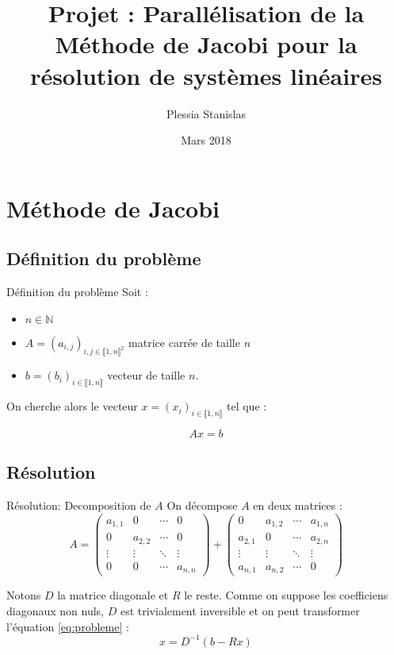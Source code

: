 \documentclass{beamer}
\title[Parallélisation de l'algorithme de Jacobi]{Projet : Parallélisation de la Méthode de Jacobi pour la résolution de systèmes linéaires}
\author{Plessia Stanislas}
\institute{}
\date{Mars 2018}
\begin{document}
\begin{frame}
  \titlepage
\end{frame}

\section{Méthode de Jacobi}

\subsection{Définition du problème}

\begin{frame}{Définition du problème}
  Soit :
  \begin{itemize}
   \item $n \in \mathbb{N}$ 
   \item $A = (a_{i,j})_{i,j \in \llbracket 1,n \rrbracket^2}$ matrice carrée de taille $n$
   \item $b = (b_i)_{i \in \llbracket 1,n \rrbracket}$ vecteur de taille $n$.
  \end{itemize}

  On cherche alors le vecteur $x = (x_i)_{i \in \llbracket 1,n \rrbracket}$ tel que :

  \begin{equation} 
      \label{eq:probleme}
      Ax = b
  \end{equation}
\end{frame}

\subsection{Résolution}

\begin{frame}{Résolution: Decomposition de $A$}
  On décompose $A$ en deux matrices :
  \[
  A =
    \begin{pmatrix}
    a_{1,1} & 0 & \cdots & 0 \\
    0 & a_{2,2} & \cdots & 0 \\
    \vdots  & \vdots  & \ddots & \vdots  \\
    0 & 0 & \cdots & a_{n,n}
   \end{pmatrix}
   +
    \begin{pmatrix}
    0 & a_{1,2} & \cdots & a_{1,n} \\
    a_{2,1} & 0 & \cdots & a_{2,n} \\
    \vdots  & \vdots  & \ddots & \vdots  \\
    a_{n,1} & a_{n,2} & \cdots & 0
   \end{pmatrix}
  \]

  Notons $D$ la matrice diagonale et $R$ le reste.
  Comme on suppose les coefficiens diagonaux non nuls, $D$ est trivialement inversible et on peut transformer l'équation \eqref{eq:probleme} :
  \[
    x = D^{-1}(b - Rx)
  \]
\end{frame}
\end{document}
